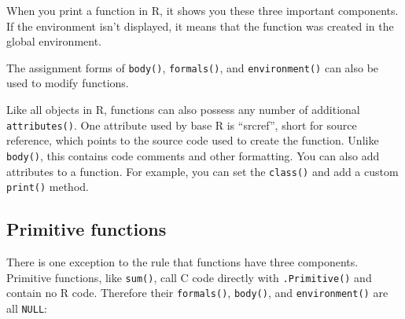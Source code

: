 When you print a function in R, it shows you these three important
components. If the environment isn't displayed, it means that the
function was created in the global environment. 
 

\begin{Shaded}
\begin{Highlighting}[]
\StringTok{ }

\end{Highlighting}
\end{Shaded}

The assignment forms of \texttt{body()}, \texttt{formals()}, and
\texttt{environment()} can also be used to modify functions.

Like all objects in R, functions can also possess any number of
additional \texttt{attributes()}. One attribute used by base R is
``srcref'', short for source reference, which points to the source code
used to create the function. Unlike \texttt{body()}, this contains code
comments and other formatting. You can also add attributes to a
function. For example, you can set the \texttt{class()} and add a custom
\texttt{print()} method. 

\subsection{Primitive functions}

There is one exception to the rule that functions have three components.
Primitive functions, like \texttt{sum()}, call C code directly with
\texttt{.Primitive()} and contain no R code. Therefore their
\texttt{formals()}, \texttt{body()}, and \texttt{environment()} are all
\texttt{NULL}: 

\begin{Shaded}
\begin{Highlighting}[]
\end{Highlighting}
\end{Shaded}

